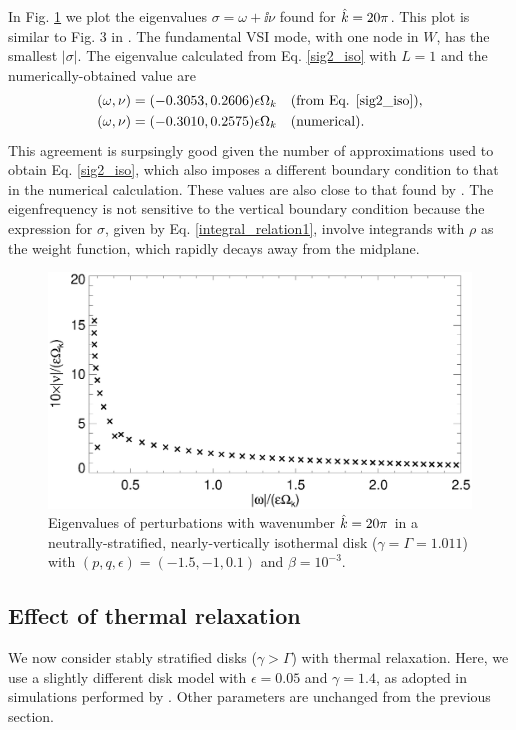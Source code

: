 In Fig. \ref{lowfreq_eigen} we plot the eigenvalues 
$\sigma = \omega + \ii\nu$ found for $\hat{k}=20\pi$. This plot is
similar to Fig. 3 in \cite{mcnally14}. The fundamental
VSI mode, with one node in $W$, has the smallest $|\sigma|$. The
eigenvalue calculated from Eq. \ref{sig2_iso} with $L=1$ and the 
numerically-obtained value are  
\begin{align*}
  (\omega,\nu) = (-0.3053,0.2606)\epsilon\Omega_k &\quad \text{(from
    Eq. \ref{sig2_iso})},\\
  (\omega,\nu) = (-0.3010,0.2575) \epsilon \Omega_k &\quad \text{(numerical)}.
\end{align*}
This agreement is surpsingly good given the number of approximations
used to obtain Eq. \ref{sig2_iso}, which also imposes a different
boundary condition to that in the numerical calculation. These values
are also close to that found by \cite{mcnally14}. The eigenfrequency
is not sensitive to the vertical boundary condition because the
expression for $\sigma$, given by Eq. \ref{integral_relation1},
involve integrands with $\rho$ as the   weight function, which rapidly
decays away from the midplane. 

\begin{figure}
  \includegraphics[width=\linewidth]{figures/eigenvalues_iso}
  \caption{Eigenvalues of perturbations with wavenumber $\hat{k}=20\pi$
    in a neutrally-stratified, nearly-vertically isothermal disk
    ($\gamma=\Gamma=1.011$) with $(p,q,\epsilon)=(-1.5,-1,0.1)$ and
    $\beta=10^{-3}$. \label{lowfreq_eigen} 
  }
\end{figure}

\subsection{Effect of thermal relaxation}
We now consider stably stratified disks ($\gamma > \Gamma$) with
thermal relaxation. Here, we use a slightly  
different disk model with $\epsilon=0.05$ and $\gamma=1.4$, as 
adopted in simulations performed by \cite{nelson13}. Other parameters 
are unchanged from the previous section.  

